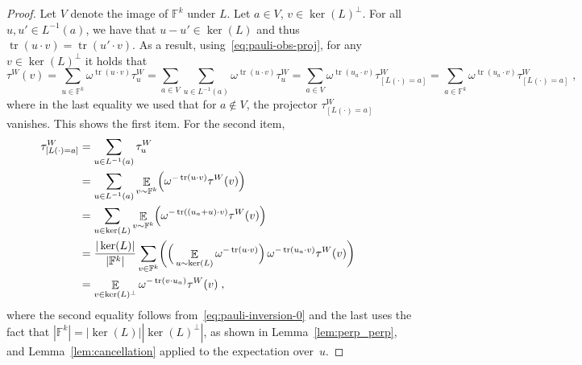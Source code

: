 \documentclass[11pt]{article}
\theoremstyle{definition}
\newcommand{\F}{\ensuremath{\mathbb{F}}}
\DeclareMathOperator{\tr}{tr}
\newcommand{\E}{\mathop{\mathbb{E}}\displaylimits}
\begin{document}
\begin{proof}
  Let $V$ denote the image of $\F^k$ under $L$.
  Let $a\in V$, $v \in \ker(L)^\perp$.
  For all $u, u' \in L^{-1}(a)$, we have that $u-u'\in \ker(L)$ and thus $\tr(u
  \cdot v) = \tr(u' \cdot v)$.
  As a result, using~\eqref{eq:pauli-obs-proj}, for any $v\in\ker(L)^\perp$ it
  holds that
  \begin{equation*}
    \tau^W(v)
    = \sum_{u \in \F^k} \omega^{\tr(u \cdot v)} \tau^W_u
    = \sum_{a \in V} \sum_{u \in L^{-1}(a)} \omega^{\tr(u \cdot v)} \tau^W_u
    = \sum_{a \in V} \omega^{\tr(u_a \cdot v)} \tau^W_{[L(\cdot)=a]}
    = \sum_{a \in \F^k} \omega^{\tr(u_a \cdot v)} \tau^W_{[L(\cdot)=a]}\;,
  \end{equation*}
  where in the last equality we used that for $a \notin V$, the projector
  $\tau^W_{[L(\cdot)=a]}$ vanishes.
  This shows the first item.
  For the second item,
  \begin{align*}
    \tau^W_{[L(\cdot)=a]}
    & = \sum_{u  \in L^{-1}(a)} \tau^W_u\\
    & =  \sum_{u  \in L^{-1}(a)} \E_{v \sim \F^k} \Bigl(
      \omega^{-\tr(u \cdot v)} \tau^W(v) \Bigr) && \\
    & =  \sum_{u \in \ker(L)} \E_{v \sim \F^k} \Bigl(
      \omega^{-\tr((u_a + u) \cdot v)} \tau^W(v) \Bigr)\\
    & = \frac{|\ker(L)|}{|\F^k|} \sum_{v \in \F^k} \biggl( \Big(
      \E_{u \sim \ker(L)} \omega^{-\tr(u \cdot v)} \Big)\,
      \omega^{-\tr(u_a \cdot v)}  \tau^W(v) \biggr)\\
    & = \E_{v \in \ker(L)^\perp} \omega^{-\tr(v \cdot u_a)} \tau^W(v)\;,
\end{align*}
where the second equality follows from~\eqref{eq:pauli-inversion-0} and the last
uses the fact that $|\F^k|=|\ker(L)||\ker(L)^\perp|$, as shown in
Lemma~\ref{lem:perp_perp}, and Lemma~\ref{lem:cancellation} applied to the
expectation over~$u$.
\end{proof}
\end{document}
